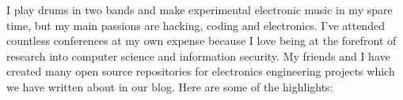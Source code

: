 
\begin{cvparagraph}
I play drums in two bands and make experimental electronic music in my spare time, but my main passions are hacking, coding and electronics. I've attended countless conferences at my own expense because I love being at the forefront of research into computer science and information security. My friends and I have created many open source repositories for electronics engineering projects which we have written about in our blog. Here are some of the highlights:
\end{cvparagraph}
